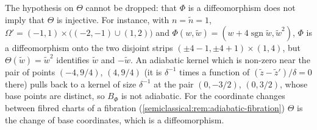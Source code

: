 The hypothesis on $\Theta$ cannot be dropped: that $\Phi$ is a diffeomorphism does not imply
that $\Theta$ is injective. For instance, with $n=\tilde n=1$,
$\Omega'=(-1,1)\times\bigl((-2,-1)\cup(1,2)\bigr)$ and
$\Phi(w,\tilde w)=(w+4\operatorname{sgn}\tilde w,\tilde w^2)$, $\Phi$ is a diffeomorphism onto the two
disjoint strips $(\pm4-1,\pm4+1)\times(1,4)$, but $\Theta(\tilde w)=\tilde w^2$ identifies $\tilde w$ and $-\tilde w$.
An adiabatic kernel which is non-zero near the pair of points $(-4,9/4)$, $(4,9/4)$ (it is
$\delta^{-1}$ times a function of $(\tilde z-\tilde z')/\delta=0$ there) pulls back to a kernel of size
$\delta^{-1}$ at the pair $(0,-3/2)$, $(0,3/2)$, whose base points are distinct, so $B_\Phi$ is
not adiabatic. For the coordinate changes between fibred charts of a fibration
(\cref{semiclassical:rem:adiabatic-fibration}) $\Theta$ is the change of base coordinates,
which is a diffeomorphism.

